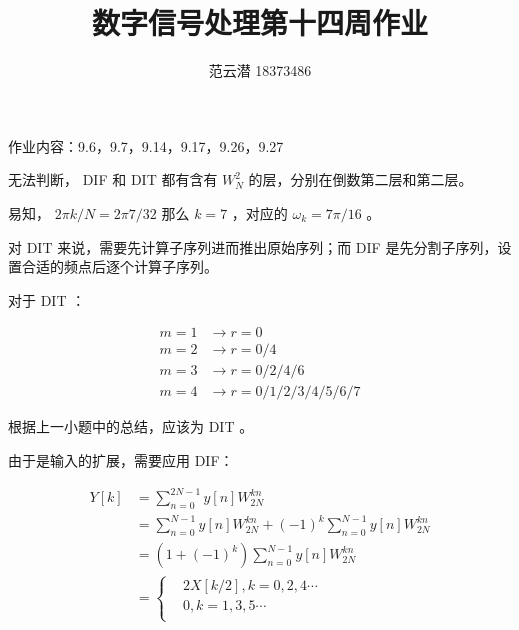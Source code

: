 \documentclass[lang=cn,11pt,a4paper,cite=authoryear,twocolumn]{elegantpaper}
\title{数字信号处理\quad 第十四周作业}
\author{范云潜 18373486}
\institute{微电子学院 184111 班}
\date{\zhtoday}
\begin{document}
\maketitle

作业内容：9.6，9.7，9.14，9.17，9.26，9.27




无法判断， DIF 和 DIT 都有含有 \(W_N^2\) 的层，分别在倒数第二层和第二层。


易知， \(2 \pi k / N = 2 \pi 7 / 32\) 那么 \(k = 7\) ，对应的 \(\omega_k = 7\pi / 16\) 。


对 DIT 来说，需要先计算子序列进而推出原始序列；而 DIF 是先分割子序列，设置合适的频点后逐个计算子序列。

对于 DIT ：

\[
\begin{aligned}
    m = 1 &\rightarrow r = 0\\
    m = 2 &\rightarrow r = 0/4\\
    m = 3 &\rightarrow r = 0/2/4/6\\
    m = 4 &\rightarrow r = 0/1/2/3/4/5/6/7
\end{aligned}
\]


根据上一小题中的总结，应该为 DIT 。


由于是输入的扩展，需要应用 DIF：

\[\begin{aligned}
    Y[k] &= \sum_{n = 0}^{2N-1} y[n] W_{2N}^{k n}\\
    &= \sum_{n=0}^{N-1}y[n] W_{2N}^{k n} + (-1)^k \sum_{n=0}^{N-1}y[n] W_{2N}^{k n} \\
    &= (1+(-1)^k)\sum_{n=0}^{N-1}y[n] W_{2N}^{k n} \\
    &= \left\{
        \begin{aligned}
            & 2 X[k/2] , k = 0, 2, 4 \cdots\\
            & 0, k = 1, 3, 5 \cdots \\
        \end{aligned}    
    \right.
\end{aligned}\]

\end{document}

